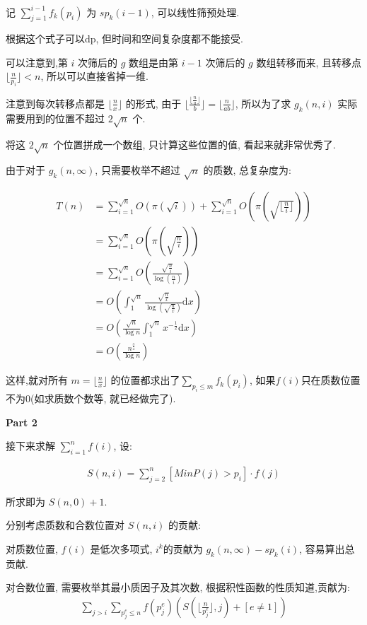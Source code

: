 \documentclass{ctexart}
\begin{document}
记 $\sum_{j=1}^{i-1}f_k(p_i)$ 为 $sp_k(i-1)$, 可以线性筛预处理.

根据这个式子可以dp, 但时间和空间复杂度都不能接受.

可以注意到,第 $i$ 次筛后的 $g$ 数组是由第 $i-1$ 次筛后的 $g$ 数组转移而来, 且转移点 $\lfloor \frac{n}{p_i} \rfloor < n$, 所以可以直接省掉一维.

注意到每次转移点都是 $\lfloor \frac{n}{x} \rfloor$ 的形式, 
由于 $\lfloor \frac{\lfloor \frac{n}{a} \rfloor}{b} \rfloor = \lfloor \frac{n}{ab} \rfloor$,
所以为了求 $g_k(n,i)$ 实际需要用到的位置不超过 $2\sqrt{n}$ 个.

将这 $2\sqrt{n}$ 个位置拼成一个数组, 只计算这些位置的值, 看起来就非常优秀了.

由于对于 $g_k(n,\infty)$, 只需要枚举不超过 $\sqrt{n}$ 的质数, 总复杂度为:

\begin{align*}
    T(n)&=\sum_{i=1}^{\sqrt{n}}O(\pi(\sqrt{i}))+\sum_{i=1}^{\sqrt{n}}O(\pi(\sqrt{\lfloor \frac{n}{i} \rfloor}))\\
        &=\sum_{i=1}^{\sqrt{n}}O(\pi(\sqrt{\frac{n}{i}}))\\
        &=\sum_{i=1}^{\sqrt{n}}O(\frac{\sqrt{\frac{n}{i}}}{\log(\frac{n}{i})})\\
        &=O(\int_{1}^{\sqrt{n}}\frac{\sqrt{\frac{n}{x}}}{\log(\sqrt{\frac{n}{x}})} \mathrm{d}x)\\
        &=O(\frac{\sqrt{n}}{\log n}\int_{1}^{\sqrt{n}}x^{-\frac{1}{2}} \mathrm{d}x)\\
        &=O(\frac{n^{\frac{3}{4}}}{\log n})
\end{align*}

这样,就对所有 $m = \lfloor \frac{n}{x} \rfloor$ 的位置都求出了$\sum_{p_i \le m} f_k(p_i)$, 如果$f(i)$只在质数位置不为$0$(如求质数个数等, 就已经做完了).

\textbf{Part 2}

接下来求解 $\sum_{i=1}^{n}f(i)$, 设:

\begin{align*}
    S(n,i)=\sum_{j=2}^{n}{[MinP(j)>p_i] \cdot f(j)}
\end{align*}

所求即为 $S(n,0)+1$.

分别考虑质数和合数位置对 $S(n,i)$ 的贡献:

\quad 对质数位置, $f(i)$ 是低次多项式, $i^k$的贡献为 $g_k(n,\infty)-sp_k(i)$, 容易算出总贡献.

\quad 对合数位置, 需要枚举其最小质因子及其次数, 根据积性函数的性质知道,贡献为:
\begin{align*}
    \sum_{j>i}\sum_{p_j^e\le n}f(p_j^e)(S(\lfloor \frac{n}{p_j^e} \rfloor,j)+[e\neq 1])
\end{align*}
\end{document}
